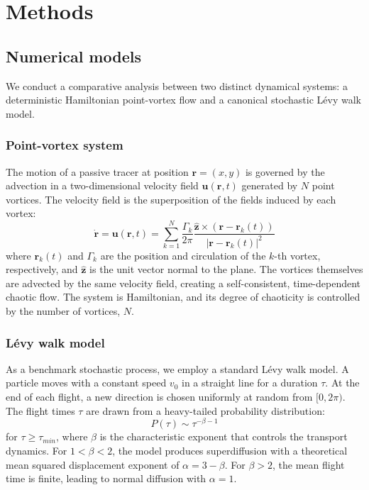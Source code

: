 \documentclass[]{article}
\begin{document}
\section{Methods}
\label{sec:methods}
\subsection{Numerical models}

We conduct a comparative analysis between two distinct dynamical systems: a deterministic Hamiltonian point-vortex flow and a canonical stochastic Lévy walk model.

\subsubsection{Point-vortex system}
The motion of a passive tracer at position $\mathbf{r} = (x, y)$ is governed by the advection in a two-dimensional velocity field $\mathbf{u}(\mathbf{r}, t)$ generated by $N$ point vortices. The velocity field is the superposition of the fields induced by each vortex:
\begin{equation}
\dot{\mathbf{r}} = \mathbf{u}(\mathbf{r}, t) = \sum_{k=1}^{N} \frac{\Gamma_k}{2\pi} \frac{\hat{\mathbf{z}} \times (\mathbf{r} - \mathbf{r}_k(t))}{|\mathbf{r} - \mathbf{r}_k(t)|^2}
\end{equation}
where $\mathbf{r}_k(t)$ and $\Gamma_k$ are the position and circulation of the $k$-th vortex, respectively, and $\hat{\mathbf{z}}$ is the unit vector normal to the plane. The vortices themselves are advected by the same velocity field, creating a self-consistent, time-dependent chaotic flow. The system is Hamiltonian, and its degree of chaoticity is controlled by the number of vortices, $N$.

\subsubsection{Lévy walk model}
As a benchmark stochastic process, we employ a standard Lévy walk model. A particle moves with a constant speed $v_0$ in a straight line for a duration $\tau$. At the end of each flight, a new direction is chosen uniformly at random from $[0, 2\pi)$. The flight times $\tau$ are drawn from a heavy-tailed probability distribution:
\begin{equation}
P(\tau) \sim \tau^{-\beta-1}
\end{equation}
for $\tau \ge \tau_{min}$, where $\beta$ is the characteristic exponent that controls the transport dynamics. For $1 < \beta < 2$, the model produces superdiffusion with a theoretical mean squared displacement exponent of $\alpha = 3 - \beta$. For $\beta > 2$, the mean flight time is finite, leading to normal diffusion with $\alpha=1$.
\end{document}
